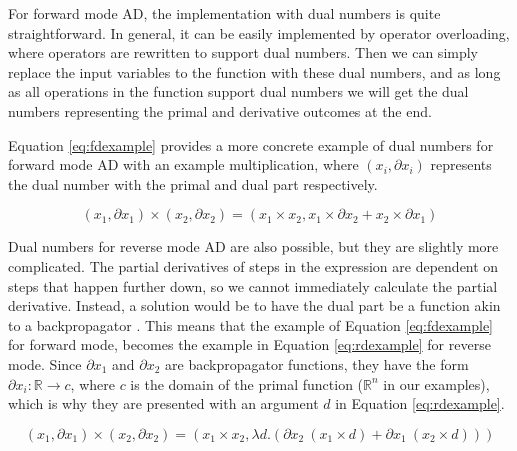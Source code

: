 \documentclass{article}
\begin{document}
            For forward mode AD, the implementation with dual numbers is quite straightforward.
            In general, it can be easily implemented by operator overloading, where operators are rewritten to support dual numbers.
            Then we can simply replace the input variables to the function with these dual numbers, and as long as all operations in the function support dual numbers we will get the dual numbers representing the primal and derivative outcomes at the end.
            
            Equation \ref{eq:fdexample} provides a more concrete example of dual numbers for forward mode AD with an example multiplication, where $(x_i, \partial x_i)$ represents the dual number with the primal and dual part respectively.

            \begin{equation} \label{eq:fdexample}
                (x_1,\partial x_1)\times(x_2,\partial x_2)=(x_1\times x_2, x_1\times\partial x_2+x_2\times\partial x_1)
            \end{equation}

            Dual numbers for reverse mode AD are also possible, but they are slightly more complicated.
            The partial derivatives of steps in the expression are dependent on steps that happen further down, so we cannot immediately calculate the partial derivative.
            Instead, a solution would be to have the dual part be a function akin to a backpropagator \cite{wang2019demystifying,smeding2022efficient}.
            This means that the example of Equation \ref{eq:fdexample} for forward mode, becomes the example in Equation \ref{eq:rdexample} for reverse mode.
            Since $\partial x_1$ and $\partial x_2$ are backpropagator functions, they have the form $\partial x_i:\mathbb{R}\to c$, where $c$ is the domain of the primal function ($\mathbb{R}^n$ in our examples), which is why they are presented with an argument $d$ in Equation \ref{eq:rdexample}.

            \begin{equation} \label{eq:rdexample}
                (x_1,\partial x_1)\times(x_2,\partial x_2)=\left(x_1\times x_2,\lambda d.\left(\partial x_2\ (x_1\times d)+\partial x_1\ (x_2\times d)\right)\right)
            \end{equation}
\end{document}
